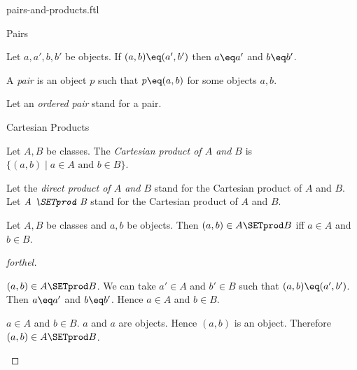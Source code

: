 \documentclass{naproche-library}
\begin{document}
\begin{smodule}[title=Ordered Pairs and Cartesian Products]{pairs-and-products.ftl}

\begin{sfragment}{Pairs}
  \begin{axiom}[forthel,id=FOUNDATIONS_04_8464577431863296]
    Let $a, a', b, b'$ be objects.
    If $(a, b) \eq (a', b')$ then $a \eq a'$ and $b \eq b'$.
  \end{axiom}

  \begin{definition}[forthel,id=FOUNDATIONS_04_4782386822774784]
    A \emph{pair} is an object $p$ such that $p \eq (a, b)$ for some objects $a, b$.

    Let an \emph{ordered pair} stand for a pair.
  \end{definition}
\end{sfragment}

\begin{sfragment}{Cartesian Products}
  \begin{definition}[forthel,id=FOUNDATIONS_04_2877806274936832]
    Let $A, B$ be classes.
    The \emph{Cartesian product of $A$ and $B$} is $\{ (a, b) \mid a \in A\text{ and }b \in B \}$.

    Let the \emph{direct product of $A$ and $B$} stand for  the Cartesian product of $A$ and $B$.
    Let $\emph{A \SETprod B}$ stand for the Cartesian product of $A$ and $B$.
  \end{definition}

  \begin{proposition}[forthel,id=FOUNDATIONS_04_1581118511906816]
    Let $A, B$ be classes and $a, b$ be objects.
    Then $(a, b) \in A \SETprod B$ iff $a \in A$ and $b \in B$.
  \end{proposition}
  \begin{proof}[forthel]
    \begin{case}{$(a, b) \in A \SETprod B$.}
      We can take $a' \in A$ and $b' \in B$ such that $(a, b) \eq (a', b')$.
      Then $a \eq a'$ and $b \eq b'$.
      Hence $a \in A$ and $b \in B$.
    \end{case}

    \begin{case}{$a \in A$ and $b \in B$.}
      $a$ and $a$ are objects.
      Hence $(a, b)$ is an object.
      Therefore $(a, b) \in A \SETprod B$.
    \end{case}
  \end{proof}


\end{sfragment}
\end{smodule}
\end{document}

